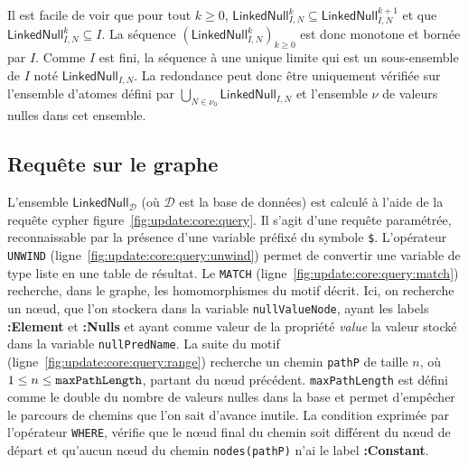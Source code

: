
\begin{proposition}
	Il est facile de voir que pour tout $k \geq 0$, $\textsf{LinkedNull}^k_{I,N} \subseteq \textsf{LinkedNull}^{k+1}_{I,N}$ et que $\textsf{LinkedNull}^k_{I,N} \subseteq I$.
	La séquence $(\textsf{LinkedNull}^k_{I,N})_{k \ge 0}$ est donc monotone et bornée par $I$.
	Comme $I$ est fini, la séquence à une unique limite qui est un sous-ensemble de $I$ noté $\textsf{LinkedNull}_{I,N}$.
	La redondance peut donc être uniquement vérifiée sur l'ensemble d'atomes défini par $\bigcup_{N \in \nu_0}\textsf{LinkedNull}_{I,N}$ et l'ensemble $\nu$ de valeurs nulles dans cet ensemble.
\end{proposition}

\subsection{Requête sur le graphe}
L'ensemble $\textsf{LinkedNull}_{\mathcal{D}}$ (où $\mathcal{D}$ est la base de données) est calculé à l'aide de la requête \gls{cypher} figure~\ref{fig:update:core:query}.
Il s'agit d'une requête paramétrée, reconnaissable par la présence d'une variable préfixé du symbole \verb|$|.
L'opérateur \verb|UNWIND| (ligne~\ref{fig:update:core:query:unwind}) permet de convertir une variable de type liste en une table de résultat.
Le \verb|MATCH| (ligne~\ref{fig:update:core:query:match}) recherche, dans le graphe, les homomorphismes du motif décrit.
Ici, on recherche un nœud, que l'on stockera dans la variable \verb|nullValueNode|, ayant les labels \textbf{:Element} et \textbf{:Nulls} et ayant comme valeur de la propriété \textit{value} la valeur stocké dans la variable \verb|nullPredName|.
La suite du motif (ligne~\ref{fig:update:core:query:range}) recherche un chemin \verb|pathP| de taille $n$, où $1 \leq n \leq \verb|maxPathLength|$, partant du nœud précédent.
\verb|maxPathLength| est défini comme le double du nombre de valeurs nulles dans la base et permet d'empêcher le parcours de chemins que l'on sait d'avance inutile.
La condition exprimée par l'opérateur \verb|WHERE|, vérifie que le nœud final du chemin soit différent du nœud de départ et qu'aucun nœud du chemin \verb|nodes(pathP)| n'ai le label \textbf{:Constant}.

